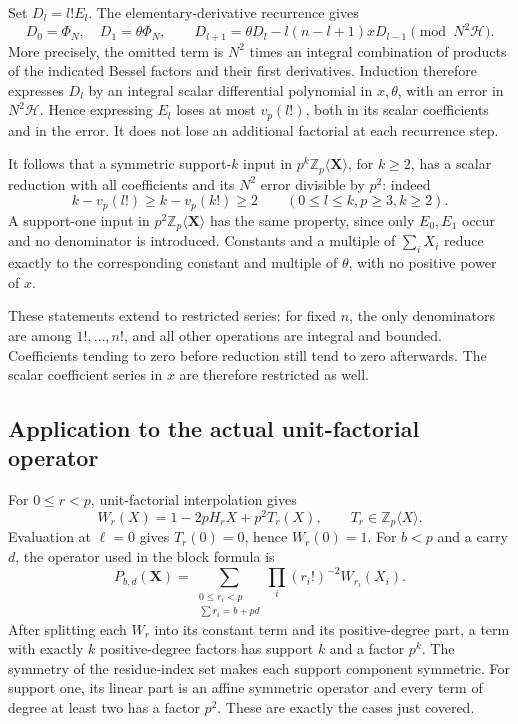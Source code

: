 \documentclass[11pt,a4paper]{article}
\theoremstyle{definition}\newtheorem{definition}[theorem]{Definition}
\theoremstyle{remark}\newtheorem{remark}[theorem]{Remark}
\numberwithin{equation}{section}
\begin{document}
Set $D_l=l!E_l$. The elementary-derivative recurrence gives
\[
 D_0=\Phi_N,\quad D_1=\theta\Phi_N,\qquad
 D_{l+1}=\theta D_l-l(n-l+1)xD_{l-1}
                         \pmod{N^2\mathcal H}.
\]
More precisely, the omitted term is $N^2$ times an integral combination
of products of the indicated Bessel factors and their first
derivatives. Induction therefore expresses $D_l$ by an integral scalar
differential polynomial in $x,\theta$, with an error in
$N^2\mathcal H$. Hence expressing $E_l$ loses at most $v_p(l!)$,
both in its scalar coefficients and in the error. It does not lose
an additional factorial at each recurrence step.

It follows that a symmetric support-$k$ input in
$p^k\mathbb Z_p\langle\mathbf X\rangle$, for $k\ge2$, has a scalar
reduction with all coefficients and its $N^2$ error divisible by $p^2$:
indeed
\[
 k-v_p(l!)\ge k-v_p(k!)\ge2\qquad(0\le l\le k, p\ge3, k\ge2).
\]
A support-one input in $p^2\mathbb Z_p\langle\mathbf X\rangle$
has the same property, since only $E_0,E_1$ occur and no denominator is
introduced. Constants and a multiple of $\sum_iX_i$ reduce exactly to
the corresponding constant and multiple of $\theta$, with no positive
power of $x$.

These statements extend to restricted series: for fixed $n$, the only
denominators are among $1!,\ldots,n!$, and all other operations are
integral and bounded. Coefficients tending to zero before reduction
still tend to zero afterwards. The scalar coefficient series in $x$
are therefore restricted as well.

\subsection{Application to the actual unit-factorial operator}
For $0\le r<p$, unit-factorial interpolation gives
\[
 W_r(X)=1-2pH_rX+p^2T_r(X),\qquad
 T_r\in\mathbb Z_p\langle X\rangle.
\]
Evaluation at $\ell=0$ gives $T_r(0)=0$, hence $W_r(0)=1$.
For $b<p$ and a carry $d$, the operator used in the block formula is
\[
 P_{b,d}(\mathbf X)=
 \sum_{\substack{0\le r_i<p\\\sum r_i=b+pd}}
 \prod_i(r_i!)^{-2}W_{r_i}(X_i).
\]
After splitting each $W_r$ into its constant term and its positive-degree
part, a term with exactly $k$ positive-degree factors has support $k$
and a factor $p^k$. The symmetry of the residue-index set makes each
support component symmetric. For support one, its linear part is an
affine symmetric operator and every term of degree at least two has
a factor $p^2$. These are exactly the cases just covered.
\end{document}
